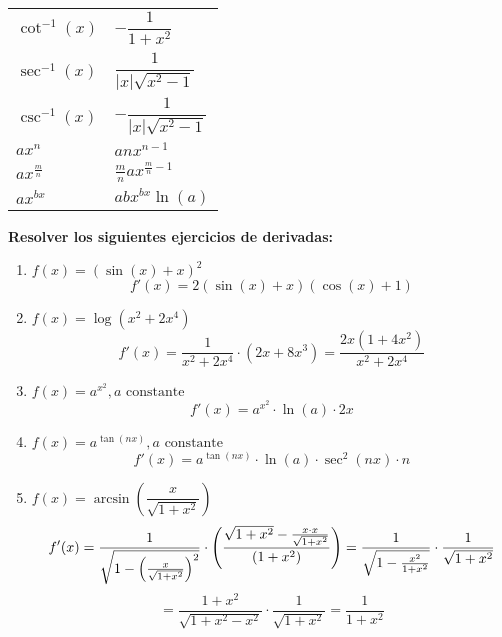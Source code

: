 \documentclass[answers]{exam} %
\begin{document}
\begin{questions}
\begin{center}
\begin{minipage}{0.5\textwidth}
\begin{tabular}{|>{\centering\arraybackslash}m{3.5cm}|>{\centering\arraybackslash}m{3cm}|}
                $\cot^{-1}(x)$     & $-\dfrac{1}{1+x^2}$             \\
                $\sec^{-1}(x)$     & $\dfrac{1}{|x|\sqrt{x^2-1}}$    \\
                $\csc^{-1}(x)$     & $-\dfrac{1}{|x|\sqrt{x^2-1}}$   \\
                $ax^n$             & $anx^{n-1}$                     \\
                $ax^{\frac{m}{n}}$ & $\frac{m}{n}ax^{\frac{m}{n}-1}$ \\
                $ax^{bx}$          & $abx^{bx} \ln(a)$               \\[9px]
                \hline
            \end{tabular}
        \end{minipage}


    \end{center}

    \vspace{0.5cm}

    \question \large\textbf{Resolver los siguientes ejercicios de derivadas: }

    \begin{enumerate}[label=\alph*.]
        \item $\displaystyle f(x)=(\sin(x) + x)^2$
              \[
                  f'(x) = 2(\sin(x) + x)(\cos(x) + 1)
              \]

        \item $\displaystyle f(x)=\log(x^2 + 2x^4)$
              \[
                  f'(x) = \frac{1}{x^2 + 2x^4} \cdot (2x + 8x^3) = \frac{2x(1 + 4x^2)}{x^2 + 2x^4}
              \]

        \item $\displaystyle f(x)=a^{x^2}, a \text{ constante}$
              \[
                  f'(x) = a^{x^2} \cdot \ln(a) \cdot 2x
              \]

        \item $\displaystyle f(x)=a^{\tan(nx)}, a \text{ constante}$
              \[
                  f'(x) = a^{\tan(nx)} \cdot \ln(a) \cdot \sec^2(nx) \cdot n
              \]

        \item $\displaystyle f(x)=\arcsin\left(\dfrac{x}{\sqrt{1+x^2}}\right)$
              \[
                  f'(x) = \frac{1}{\sqrt{1-\left(\frac{x}{\sqrt{1+x^2}}\right)^2}} \cdot \left( \frac{\sqrt{1+x^2} - \frac{x \cdot x}{\sqrt{1+x^2}}}{(1+x^2)} \right) = \frac{1}{\sqrt{1 - \frac{x^2}{1+x^2}}} \cdot \frac{1}{\sqrt{1+x^2}} \\
              \]
              \[
                  = \frac{1+x^2}{\sqrt{1+x^2-x^2}} \cdot \frac{1}{\sqrt{1+x^2}} = \frac{1}{1+x^2}
              \]



\end{enumerate}
\end{questions}
\end{document}

